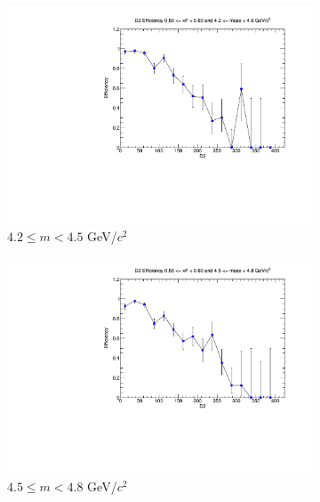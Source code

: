 \documentclass[11pt]{article}
\begin{document}
\begin{figure}[p]
    \centering
    \begin{subfigure}[b]{0.32\textwidth}
        \centering
        \includegraphics[width=\textwidth]{./kTrackerEfficiencyPlots/D2_Efficiency_xF11_mass0.pdf}
        \caption{$4.2 \leq m < 4.5$ GeV/$c^2$}
    \end{subfigure}\hfill
    \begin{subfigure}[b]{0.32\textwidth}
        \centering
        \includegraphics[width=\textwidth]{./kTrackerEfficiencyPlots/D2_Efficiency_xF11_mass1.pdf}
        \caption{$4.5 \leq m < 4.8$ GeV/$c^2$}
    \end{subfigure}\hfill
    \begin{subfigure}[b]{0.32\textwidth}
        \centering

\end{subfigure}
\end{figure}
\end{document}
